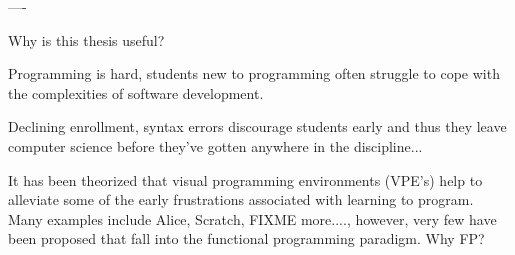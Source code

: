 ----

Why is this thesis useful?

Programming is hard, students new to programming often struggle to cope with the complexities of software development.

Declining enrollment, syntax errors discourage students early and thus they leave computer science before they've
gotten anywhere in the discipline...

It has been theorized that visual programming environments (VPE's) help to alleviate some of the early frustrations
associated with learning to program.  Many examples include Alice, Scratch, FIXME more...., however, very few have
been proposed that fall into the functional programming paradigm.  Why FP?
